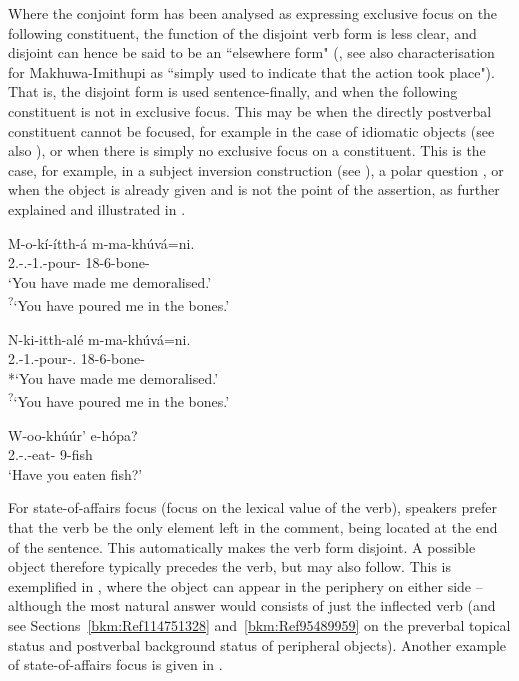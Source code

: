 \documentclass[output=paper]{langscibook}
\begin{document}
Where the conjoint form has been analysed as expressing exclusive focus on the following constituent, the function of the disjoint verb form is less clear, and disjoint can hence be said to be an ``elsewhere form" (\citealt{vanderWal2009a}, see also  characterisation for Makhuwa-Imithupi as ``simply used to indicate that the action took place"). That is, the disjoint form is used sentence-finally, and when the following constituent is not in exclusive focus. This may be when the directly postverbal constituent cannot be focused, for example in the case of idiomatic objects  (see also \citealt{vanderWal2021}), or when there is simply no exclusive focus on a constituent. This is the case, for example, in a subject inversion construction (see ), a polar question , or when the object is already given and is not the point of the assertion, as further explained and illustrated in .

\ea
\label{bkm:Ref110502241}
\ea
\gll
M-o-kí-ítth-á  m-ma-khúvá=ni.\\
2\PL{}.\SM{}-\PFV{}.\DJ{}-1\SG{}.\OM{}-pour-\FV{}  18-6-bone-\LOC{}\\
\glt
‘You have made me demoralised.’\\
\textsuperscript{?}`You have poured me in the bones.’

\ex
\gll
N-ki{}-itth{}-alé  m{}-ma{}-khúvá=ni.\\
2\PL{}.\SM{}-1\SG{}.\OM{}-pour-\PFV{}.\CJ{}  18-6-bone-\LOC{}\\
\glt
*`You have made me demoralised.’\\
\textsuperscript{?}`You have poured me in the bones.’

\z
\z

\ea
\label{bkm:Ref109490423}
\gll
W-oo-khúúr’  e-hópa?\\
2\SG{}.\SM{}-\PFV{}.\DJ{}-eat-\FV{}  9-fish\\
\glt
‘Have you eaten fish?’\\

\z

For state-of-affairs focus (focus on the lexical value of the verb), speakers prefer that the verb be the only element left in the comment, being located at the end of the sentence. This automatically makes the verb form disjoint. A possible object therefore typically precedes the verb, but may also follow. This is exemplified in , where the object can appear in the periphery on either side – although the most natural answer would consists of just the inflected verb (and see Sections~\ref{bkm:Ref114751328} and~\ref{bkm:Ref95489959} on the preverbal topical status and postverbal background status of peripheral objects). Another example of state-of-affairs focus is given in .
\end{document}
